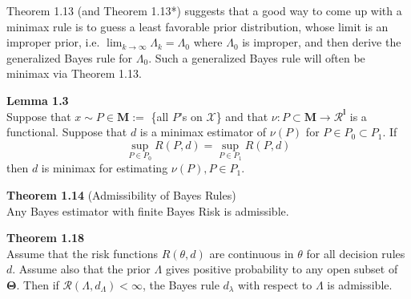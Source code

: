 \documentclass[12pt]{article}
\numberwithin{equation}{section}
\begin{document}
Theorem 1.13 (and Theorem 1.13*) suggests that a good way to come up
with a minimax rule is to guess a least favorable prior distribution, whose limit is an improper prior, i.e. $\lim_{k \to \infty} \Lambda_k = \Lambda_0$ where $\Lambda_0$ is improper, and then derive the generalized Bayes rule for $\Lambda_0$. Such a generalized Bayes rule will often be minimax via Theorem 1.13.


\textbf{Lemma 1.3} \\
Suppose that $x \sim P \in \mathbf{M} := $ \{all $P$'s on $\mathcal{X}$\} and that $\nu : P \subset \mathbf{M} \to \mathbf{\mathcal{R}^l}$ is a functional. Suppose that $d$ is a minimax estimator of $\nu(P)$ for $P \in P_0 \subset P_1$. If
\begin{equation*}
  \sup_{P \in P_0} R(P, d) = \sup_{P \in P_1} R(P, d)
\end{equation*}
%
then $d$ is minimax for estimating $\nu(P), P \in P_1$. 

\textbf{Theorem 1.14} (Admissibility of Bayes Rules) \\
Any Bayes estimator with finite Bayes Risk is admissible.

\textbf{Theorem 1.18} \\
Assume that the risk functions $R(\theta, d)$ are continuous in $\theta$ for all decision rules $d$. Assume also that the prior $\Lambda$ gives positive probability to any open subset of $\mathbf{\Theta}$. Then if $\mathcal{R}(\Lambda, d_{\Lambda}) < \infty$, the Bayes rule $d_{\lambda}$ with respect to $\Lambda$ is admissible.
\end{document}
